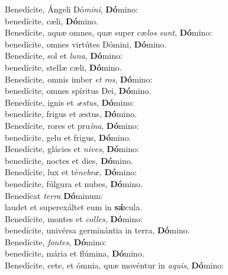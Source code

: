 \evenverse Benedícite, Ángeli Dó\textit{mi}\textit{ni}, \textbf{Dó}mino:~\*\\
\evenverse benedícite, cæli, \textbf{Dó}mino.\\
\oddverse Benedícite, aquæ omnes, quæ super cæ\textit{los} \textit{sunt}, \textbf{Dó}mino:~\*\\
\oddverse benedícite, omnes virtútes Dómini, \textbf{Dó}mino.\\
\evenverse Benedícite, sol et \textit{lu}\textit{na}, \textbf{Dó}mino:~\*\\
\evenverse benedícite, stellæ cæli, \textbf{Dó}mino.\\
\oddverse Benedícite, omnis imber \textit{et} \textit{ros}, \textbf{Dó}mino:~\*\\
\oddverse benedícite, omnes spíritus Dei, \textbf{Dó}mino.\\
\evenverse Benedícite, ignis et \textit{æ}\textit{stus}, \textbf{Dó}mino:~\*\\
\evenverse benedícite, frigus et æstus, \textbf{Dó}mino.\\
\oddverse Benedícite, rores et pru\textit{í}\textit{na}, \textbf{Dó}mino:~\*\\
\oddverse benedícite, gelu et frigus, \textbf{Dó}mino.\\
\evenverse Benedícite, glácies et \textit{ni}\textit{ves}, \textbf{Dó}mino:~\*\\
\evenverse benedícite, noctes et dies, \textbf{Dó}mino.\\
\oddverse Benedícite, lux et té\textit{ne}\textit{bræ}, \textbf{Dó}mino:~\*\\
\oddverse benedícite, fúlgura et nubes, \textbf{Dó}mino.\\
\evenverse Benedícat \textit{ter}\textit{ra} \textbf{Dó}minum:~\*\\
\evenverse laudet et superexáltet eum in \textbf{sǽ}cula.\\
\oddverse Benedícite, montes et \textit{col}\textit{les}, \textbf{Dó}mino:~\*\\
\oddverse benedícite, univérsa germinántia in terra, \textbf{Dó}mino.\\
\evenverse Benedícite, \textit{fon}\textit{tes}, \textbf{Dó}mino:~\*\\
\evenverse benedícite, mária et flúmina, \textbf{Dó}mino.\\
\oddverse Benedícite, cete, et ómnia, quæ movéntur in \textit{a}\textit{quis}, \textbf{Dó}mino:~\*\\
